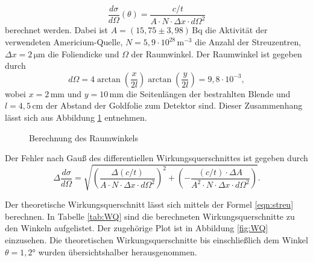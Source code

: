\begin{equation}
  \frac{d\sigma}{d\Omega}(\theta) = \frac{c/t}{A\cdot{N}\cdot\Delta{x}\cdot d\Omega^2}
  \label{WQbla}
\end{equation}
berechnet werden.
Dabei ist $A = (15,75\pm3,98)\,\text{Bq}$ die Aktivität der verwendeten Americium-Quelle, $N = 5,9\cdot10^{28}\,\text{m}^{-3}$ die Anzahl der Streuzentren,
$\Delta{x} = 2\,\si{\micro\metre}$ die Foliendicke und $\Omega$ der Raumwinkel.
Der Raumwinkel ist gegeben durch
\begin{equation}
  d\Omega = 4\arctan\left( \frac{x}{2l} \right)\arctan\left( \frac{y}{2l} \right) = 9,8\cdot10^{-3},
\end{equation}
wobei $x = 2\,\text{mm}$ und $y=10\,\text{mm}$ die Seitenlängen der bestrahlten Blende und
$l = 4,5\,\text{cm}$ der Abstand der Goldfolie zum Detektor sind.
Dieser Zusammenhang lässt sich aus Abbildung \ref{fig:raumw} entnehmen.
\begin{figure}[H]
  \centering
{}
\caption{Berechnung des Raumwinkels}
\label{fig:raumw}
\end{figure}


Der Fehler nach Gauß des differentiellen Wirkungsquerschnittes ist gegeben durch
\begin{equation}
  \Delta{\frac{d\sigma}{d\Omega}} = \sqrt{ \left(\frac{\Delta(c/t)}{A\cdot{N}\cdot\Delta{x}\cdot d\Omega^2}\right)^2 + \left( -\frac{(c/t)\cdot\Delta{A}}{A^2\cdot{N}\cdot\Delta{x}\cdot d\Omega^2} \right) }.
\end{equation}

Der theoretische Wirkungsquerschnitt lässt sich mittels der Formel \eqref{eqn:streu} berechnen.
In Tabelle \ref{tab:WQ} sind die berechneten Wirkungsquerschnitte zu den Winkeln aufgelistet.
Der zugehörige Plot ist in Abbildung \ref{fig:WQ} einzusehen.
Die theoretischen Wirkungsquerschnitte bis einschließlich dem Winkel $\theta = 1,2°$ wurden übersichtshalber herausgenommen.


